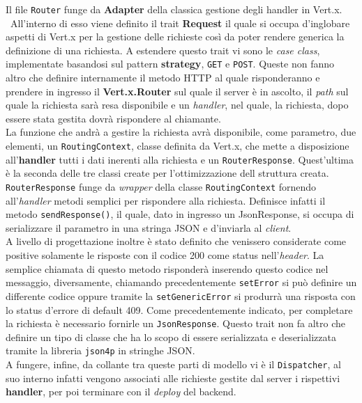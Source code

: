	  Il file \texttt{Router} funge da \textbf{Adapter} della classica gestione degli handler in Vert.x.\\\
	  All'interno di esso viene definito il trait \textbf{Request} il quale si occupa d'inglobare aspetti di Vert.x per la gestione delle richieste così da poter rendere generica la definizione di una richiesta.
	  A estendere questo trait vi sono le \textit{case class}, implementate basandosi sul pattern \textbf{strategy}, \texttt{GET} e \texttt{POST}. Queste non fanno altro che definire internamente il metodo HTTP al quale risponderanno e prendere in ingresso il \textbf{Vert.x.Router} sul quale il server è in ascolto, il \textit{path} sul quale la richiesta sarà resa disponibile e un \textit{handler}, nel quale, la richiesta, dopo essere stata gestita dovrà rispondere al chiamante. \\
	  La funzione che andrà a gestire la richiesta avrà disponibile, come parametro, due elementi, un \texttt{RoutingContext}, classe definita da Vert.x, che mette a disposizione all'\textbf{handler} tutti i dati inerenti alla richiesta e un \texttt{RouterResponse}.
	  Quest'ultima è la seconda delle tre classi create per l'ottimizzazione dell struttura creata.
	  \\
	  \texttt{RouterResponse} funge da \textit{wrapper} della classe \texttt{RoutingContext} fornendo all'\textit{handler} metodi semplici per rispondere alla richiesta. Definisce infatti il metodo \texttt{sendResponse()}, il quale, dato in ingresso un JsonResponse, si occupa di serializzare il parametro in una stringa JSON e d'inviarla al \textit{client}.
	  \\
	  A livello di progettazione inoltre è stato definito che venissero considerate come positive solamente le risposte con il codice 200 come status nell'\textit{header}. La semplice chiamata di questo metodo risponderà inserendo questo codice nel messaggio, diversamente, chiamando precedentemente \texttt{setError} si può definire un differente codice oppure tramite la \texttt{setGenericError} si produrrà una risposta con lo status d'errore di default 409.
	  Come precedentemente indicato, per completare la richiesta è necessario fornirle un \texttt{JsonResponse}. Questo trait non fa altro che definire un tipo di classe che ha lo scopo di essere serializzata e deserializzata tramite la libreria \texttt{json4p} in stringhe JSON. \\
	  A fungere, infine, da collante tra queste parti di modello vi è il \texttt{Dispatcher}, al suo interno infatti vengono associati alle richieste gestite dal server i rispettivi \textbf{handler}, per poi terminare con il \textit{deploy} del backend.

